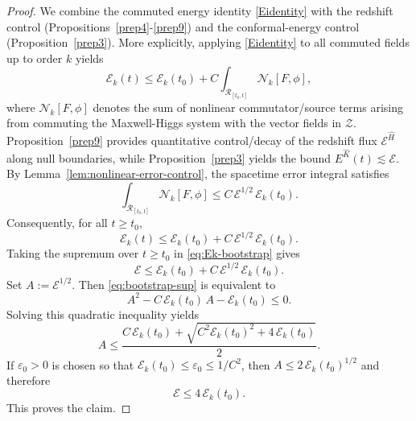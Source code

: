 \documentclass[11pt]{article}
\numberwithin{equation}{section}
\theoremstyle{plain}
\theoremstyle{definition}
\theoremstyle{remark}
\begin{document}
\begin{proof}
We combine the commuted energy identity \eqref{Eidentity} with the redshift control
(Propositions~\ref{prep4}-\ref{prep9}) and the conformal-energy control (Proposition~\ref{prep3}). More explicitly, applying \eqref{Eidentity} to all commuted fields up to order $k$ yields
\begin{equation}
 \mathcal{E}_k(t)
\le
\mathcal{E}_k(t_0)
+
C \int_{\mathcal{R}_{[t_0,t]}}
\mathcal{N}_k[F,\phi],
\end{equation}
where $\mathcal{N}_k[F,\phi]$ denotes the sum of nonlinear commutator/source terms arising from commuting the Maxwell-Higgs system with the vector fields in $\mathcal Z$. Proposition~\ref{prep9} provides quantitative control/decay of the redshift flux
$\mathcal{E}^{\hat H}$ along null boundaries, while Proposition~\ref{prep3} yields the bound $E^{\hat K}(t)\lesssim \mathcal{E}$. By Lemma~\ref{lem:nonlinear-error-control}, the spacetime error integral satisfies
\begin{equation}
\int_{\mathcal{R}_{[t_0,t]}} \mathcal{N}_k[F,\phi]
\le
C\,\mathcal{E}^{1/2}\,\mathcal{E}_k(t_0).
\end{equation}
Consequently, for all $t\ge t_0$,
\begin{equation}\label{eq:Ek-bootstrap}
\mathcal{E}_k(t)
\le
\mathcal{E}_k(t_0) + C\,\mathcal{E}^{1/2}\,\mathcal{E}_k(t_0).
\end{equation}
Taking the supremum over $t\ge t_0$ in \eqref{eq:Ek-bootstrap} gives
\begin{equation}\label{eq:bootstrap-sup}
\mathcal{E}
\le
\mathcal{E}_k(t_0) + C\,\mathcal{E}^{1/2}\,\mathcal{E}_k(t_0).
\end{equation}
Set $A:=\mathcal{E}^{1/2}$.
Then \eqref{eq:bootstrap-sup} is equivalent to
\begin{equation}
A^{2}-C\,\mathcal{E}_k(t_0)\,A-\mathcal{E}_k(t_0)\le 0.
\end{equation}
Solving this quadratic inequality yields
\begin{equation}
A\le \frac{C\,\mathcal{E}_k(t_0)+\sqrt{C^{2}\mathcal{E}_k(t_0)^{2}+4\,\mathcal{E}_k(t_0)}}{2}.
\end{equation}
If $\varepsilon_{0}>0$ is chosen so that $\mathcal{E}_k(t_0)\le \varepsilon_{0}\le 1/C^{2}$, then $A\le 2\,\mathcal{E}_k(t_0)^{1/2}$ and therefore
\begin{equation}
\mathcal{E}\le 4\,\mathcal{E}_k(t_0).
\end{equation}
This proves the claim.
\end{proof}
\end{document}
